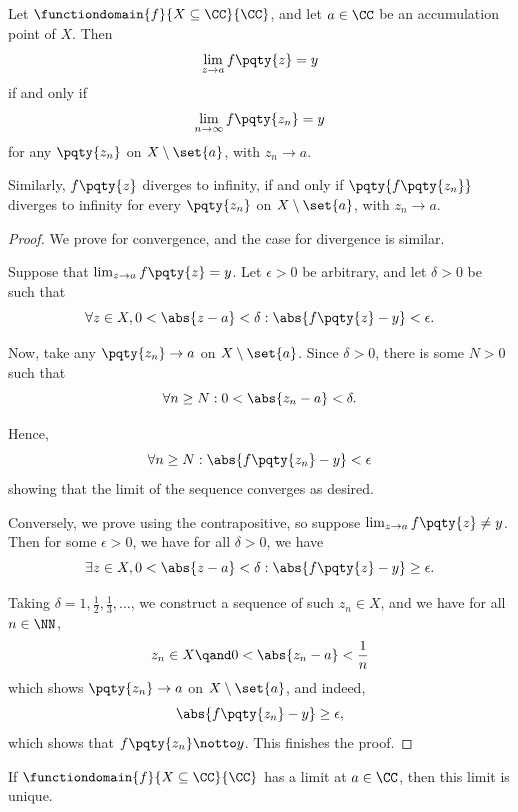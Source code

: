 \begin{lemma}
    \label{lem:fn-sequential-limits}%
    Let \(\functiondomain{f}{X \subseteq \CC}{\CC}\), and let \(a \in \CC\) be an accumulation point of \(X\). Then
    \[
        \lim_{z \to a} f\pqty{z} = y
    \]
    if and only if
    \[
        \lim_{n \to \infty} f\pqty{z_n} = y
    \]
    for any \(\pqty{z_n}\) on \(X \setminus \set{a}\), with \(z_n \to a\).

    Similarly, \(f\pqty{z}\) diverges to infinity, if and only if \(\pqty{f\pqty{z_n}}\) diverges to infinity for every \(\pqty{z_n}\) on \(X \setminus \set{a}\), with \(z_n \to a\).
\end{lemma}

\begin{proof}
    We prove for convergence, and the case for divergence is similar.
    
    Suppose that \(\lim_{z \to a} f\pqty{z} = y\). Let \(\epsilon > 0\) be arbitrary, and let \(\delta > 0\) be such that
    \[
        \forall z \in X, 0 < \abs{z - a} < \delta: \abs{f\pqty{z} - y} < \epsilon.
    \]

    Now, take any \(\pqty{z_n} \to a\) on \(X \setminus \set{a}\). Since \(\delta > 0\), there is some \(N > 0\) such that
    \[
        \forall n \geq N: 0 < \abs{z_n - a} < \delta.
    \]

    Hence,
    \[
        \forall n \geq N: \abs{f\pqty{z_n} - y} < \epsilon
    \]
    showing that the limit of the sequence converges as desired.

    Conversely, we prove using the contrapositive, so suppose \(\lim_{z \to a} f\pqty{z} \neq y\). Then for some \(\epsilon > 0\), we have for all \(\delta > 0\), we have
    \[
        \exists z \in X, 0 < \abs{z - a} < \delta: \abs{f\pqty{z} - y} \geq \epsilon.
    \]

    Taking \(\delta = 1, \frac{1}{2}, \frac{1}{3}, \ldots\), we construct a sequence of such \(z_n \in X\), and we have for all \(n \in \NN\),
    \[
        z_n \in X \qand 0 < \abs{z_n - a} < \frac{1}{n}
    \]
    which shows \(\pqty{z_n} \to a\) on \(X \setminus \set{a}\), and indeed,
    \[
        \abs{f\pqty{z_n} - y} \geq \epsilon,
    \]
    which shows that \(f\pqty{z_n} \notto y\). This finishes the proof.
\end{proof}

\begin{lemma}
    \label{lem:fn-limit-unique}%
    If \(\functiondomain{f}{X \subseteq \CC}{\CC}\) has a limit at \(a \in \CC\), then this limit is unique.
\end{lemma}


